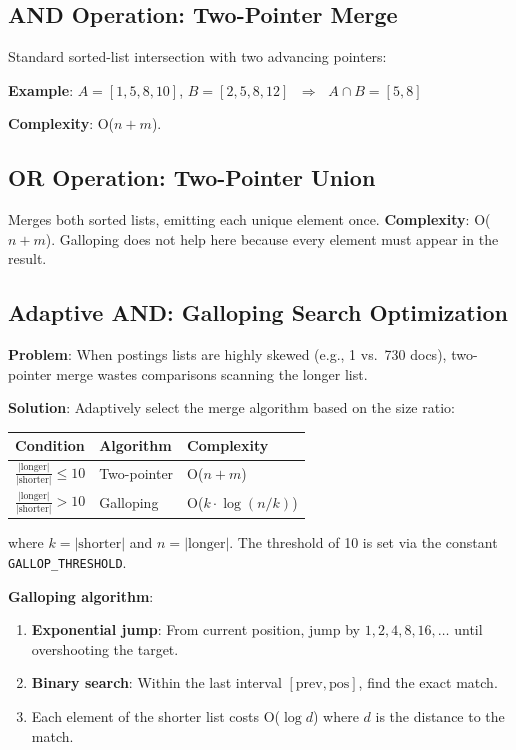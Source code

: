 \documentclass[12pt,a4paper]{article}
\begin{document}
\subsection{AND Operation: Two-Pointer Merge}
\label{sec:and}

Standard sorted-list intersection with two advancing pointers:

\medskip
\noindent\textbf{Example}: $A = [1, 5, 8, 10]$, $B = [2, 5, 8, 12]$
$\;\Longrightarrow\;$ $A \cap B = [5, 8]$

\medskip\noindent\textbf{Complexity}: O($n + m$).

\subsection{OR Operation: Two-Pointer Union}

Merges both sorted lists, emitting each unique element once.
\textbf{Complexity}: O($n + m$).  Galloping does not help here because every
element must appear in the result.

\subsection{Adaptive AND: Galloping Search Optimization}
\label{sec:galloping}

\textbf{Problem}: When postings lists are highly skewed (e.g., 1 vs.\ 730 docs),
two-pointer merge wastes comparisons scanning the longer list.

\textbf{Solution}: Adaptively select the merge algorithm based on the size ratio:

\begin{center}
\begin{tabular}{@{}l l l@{}}
\toprule
\textbf{Condition} & \textbf{Algorithm} & \textbf{Complexity} \\
\midrule
$\frac{|\text{longer}|}{|\text{shorter}|} \leq 10$ & Two-pointer & O($n + m$) \\[3pt]
$\frac{|\text{longer}|}{|\text{shorter}|} > 10$ & Galloping & O($k \cdot \log(n/k)$) \\
\bottomrule
\end{tabular}
\end{center}

\noindent where $k = |\text{shorter}|$ and $n = |\text{longer}|$.
The threshold of 10 is set via the constant \texttt{GALLOP\_THRESHOLD}.

\textbf{Galloping algorithm}:
\begin{enumerate}[noitemsep]
  \item \textbf{Exponential jump}: From current position, jump by $1, 2, 4, 8, 16, \ldots$ until overshooting the target.
  \item \textbf{Binary search}: Within the last interval $[\text{prev}, \text{pos}]$, find the exact match.
  \item Each element of the shorter list costs O($\log d$) where $d$ is the distance to the match.
\end{enumerate}
\end{document}
